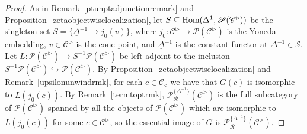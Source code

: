 \documentclass{tac}
\newcommand{\s}[1]{\mathscr{#1}}
\newcommand{\tx}[1]{\textnormal{#1}}
\newcommand{\ul}[1]{\underline{#1}}
\begin{document}
\begin{proof} As in Remark~\ref{ptunptadjunctionremark} and Proposition~\ref{zetaobjectwiselocalization}, let $S \subseteq \tx{Hom}(\Delta^1 , \s{P}(\s{C}^\triangleright ))$ be the singleton set $S = \{ \ul{\Delta}^{-1} \to j_0 (v) \}$, where $j_0 : \s{C}^\triangleright \to \s{P}(\s{C}^\triangleright)$ is the Yoneda embedding, $v \in \s{C}^\triangleright$ is the cone point, and $\ul{\Delta}^{-1}$ is the constant functor at $\Delta^{-1} \in \s{S}$.  Let $L : \s{P}(\s{C}^\triangleright ) \to S^{-1} \s{P}(\s{C}^\triangleright )$ be left adjoint to the inclusion $S^{-1} \s{P}(\s{C}^\triangleright ) \hookrightarrow \s{P}(\s{C}^\triangleright )$.  By Proposition~\ref{zetaobjectwiselocalization} and Remark~\ref{upsilonunwindrmk}, for each $c\in \s{C}_\diamond$ we have that $G (c)$ is isomorphic to $L( j_0 (c))$.  By Remark~\ref{termtoptrmk}, $\s{P}^{\{ \Delta^{-1} \}}_{\s{R}}(\s{C}^\triangleright)$ is the full subcategory of $\s{P}(\s{C}^\triangleright )$ spanned by all the objects of $\s{P}(\s{C}^\triangleright )$ which are isomorphic to $L( j_0 (c))$ for some $c\in \s{C}^\triangleright$, so the essential image of $G$ is  $\s{P}^{\{ \Delta^{-1} \}}_{\s{R}}(\s{C}^\triangleright)$.

\hfill


\end{proof}
\end{document}
